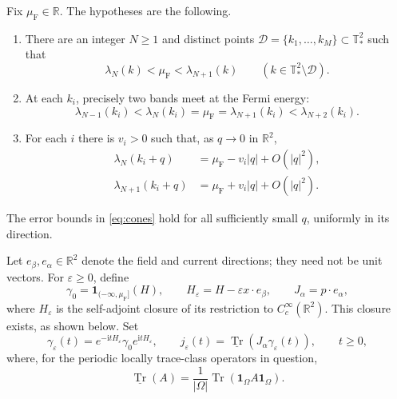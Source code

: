 \documentclass[11pt,a4paper]{article}
\numberwithin{equation}{section}
\newcommand{\R}{\mathbb R}
\newcommand{\T}{\mathbb T}
\newcommand{\one}{\mathbf 1}
\newcommand{\cD}{\mathcal D}
\newcommand{\trv}{\underline{\operatorname{Tr}}}
\newcommand{\ii}{\mathrm i}
\DeclareMathOperator{\Tr}{Tr}
\theoremstyle{remark}
\begin{document}
Fix $\mu_{\mathrm F}\in\R$. The hypotheses are the following.
\begin{enumerate}
\item There are an integer $N\geq1$ and distinct points
 $\cD=\{k_1,\ldots,k_M\}\subset\T_*^2$ such that
 \begin{equation}\label{eq:gap}
  \lambda_N(k)<\mu_{\mathrm F}<\lambda_{N+1}(k)
  \qquad(k\in\T_*^2\setminus\cD).
 \end{equation}
\item At each $k_i$, precisely two bands meet at the Fermi energy:
 \begin{equation}\label{eq:double}
  \lambda_{N-1}(k_i)<\lambda_N(k_i)=\mu_{\mathrm F}
  =\lambda_{N+1}(k_i)<\lambda_{N+2}(k_i).
 \end{equation}
\item For each $i$ there is $v_i>0$ such that, as $q\to0$ in $\R^2$,
 \begin{equation}\label{eq:cones}
 \begin{split}
  \lambda_N(k_i+q)&=\mu_{\mathrm F}-v_i|q|+O(|q|^2),\\
  \lambda_{N+1}(k_i+q)&=\mu_{\mathrm F}+v_i|q|+O(|q|^2).
 \end{split}
 \end{equation}
\end{enumerate}
The error bounds in \eqref{eq:cones} hold for all sufficiently small $q$,
uniformly in its direction.

Let $e_\beta,e_\alpha\in\R^2$ denote the field and current directions;
they need not be unit vectors. For $\varepsilon\geq0$, define
\begin{equation}\label{eq:stark}
 \gamma_0=\one_{(-\infty,\mu_{\mathrm F}]}(H),\qquad
 H_\varepsilon=H-\varepsilon x\cdot e_\beta,\qquad
 J_\alpha=p\cdot e_\alpha,
\end{equation}
where $H_\varepsilon$ is the self-adjoint closure of its restriction to
$C_c^\infty(\R^2)$. This closure exists, as shown below. Set
\begin{equation}\label{eq:current}
 \gamma_\varepsilon(t)=e^{-\ii tH_\varepsilon}\gamma_0
                            e^{\ii tH_\varepsilon},\qquad
 j_\varepsilon(t)=\trv(J_\alpha\gamma_\varepsilon(t)),
 \qquad t\geq0,
\end{equation}
where, for the periodic locally trace-class operators in question,
\begin{equation}\label{eq:trace-definition}
 \trv(A)=\frac1{|\Omega|}\Tr(\one_\Omega A\one_\Omega).
\end{equation}
\end{document}
